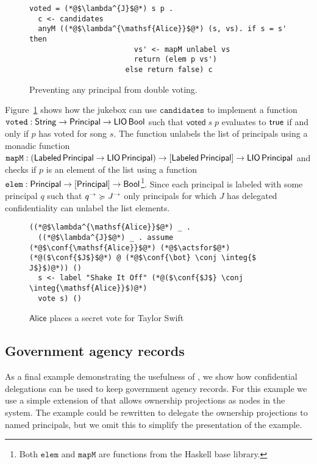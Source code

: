 \begin{figure}
\centering
\begin{lstlisting}
voted = (*@$\lambda^{J}$@*) s p .
  c <- candidates
  anyM ((*@$\lambda^{\mathsf{Alice}}$@*) (s, vs). if s = s' then
                        vs' <- mapM unlabel vs
                        return (elem p vs')
                      else return false) c
\end{lstlisting}
\caption{Preventing any principal from double voting.}
\label{fig:prevent-double-voting}
\end{figure}

Figure~\ref{fig:prevent-double-voting} shows how the jukebox can use $\mathtt{candidates}$ to implement a function $\mathtt{voted}: \mathsf{String} \to \mathsf{Principal} \to \mathsf{LIO}\,\mathsf{Bool}$ such that $\mathsf{voted}\; s\; p$ evaluates to $\mathsf{true}$ if and only if $p$ has voted for song $s$. The function unlabels the list of principals using a monadic function $\mathtt{mapM}: (\mathsf{Labeled}\,\mathsf{Principal} \to \mathsf{LIO}\,\mathsf{Principal}) \to \lbrack\mathsf{Labeled}\,\mathsf{Principal}\rbrack \to \mathsf{LIO}\,\mathsf{Principal}$ and checks if $p$ is an element of the list using a function $\mathtt{elem}: \mathsf{Principal} \to \lbrack\mathsf{Principal}\rbrack \to \mathsf{Bool}$\footnote{Both $\mathtt{elem}$ and $\mathtt{mapM}$ are functions from the Haskell base library.}. Since each principal is labeled with some principal $q$ such that $q^{\rightarrow} \succcurlyeq J^{\rightarrow}$ only principals for which $J$ has delegated confidentiality can unlabel the list elements.

\begin{figure}
\centering
\begin{lstlisting}
((*@$\lambda^{\mathsf{Alice}}$@*) _ .
  ((*@$\lambda^{J}$@*) _ . assume (*@$\conf{\mathsf{Alice}}$@*) (*@$\actsfor$@*) (*@($\conf{$J$}$@*) @ (*@$\conf{\bot} \conj \integ{$ J$}$)@*)) ()
  s <- label "Shake It Off" (*@($\conf{$J$} \conj \integ{\mathsf{Alice}}$)@*)
  vote s) ()
\end{lstlisting}
\caption{$\mathsf{Alice}$ places a secret vote for Taylor Swift}
\label{fig:jukebox-alice-votes-for-taylor-swift}
\end{figure}

\subsection{Government agency records}\label{subsec:agents}
As a final example demonstrating the usefulness of \lang, we show how confidential delegations can be used to keep government agency records. For this example we use a simple extension of \lang{} that allows ownership projections as nodes in the system. The example could be rewritten to delegate the ownership projections to named principals, but we omit this to simplify the presentation of the example.

